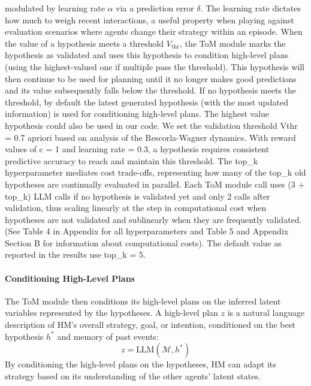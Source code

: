 \documentclass{article} %
\begin{document}
modulated by learning rate \( \alpha \) via a prediction error \( \delta \). The learning rate dictates how much to weigh recent interactions, a useful property when playing against evaluation scenarios where agents change their strategy within an episode. When the value of a hypothesis meets a threshold \( V_{\text{thr}} \), the ToM module marks the hypothesis as validated and uses this hypothesis to condition high-level plans (using the highest-valued one if multiple pass the threshold). This hypothesis will then continue to be used for planning until it no longer makes good predictions and its value subsequently falls below the threshold. If no hypothesis meets the threshold, by default the latest generated hypothesis (with the most updated information) is used for conditioning high-level plans. The highest value hypothesis could also be used in our code. We set the validation threshold Vthr = 0.7 apriori based on analysis of the Rescorla-Wagner dynamics. With reward values of c = 1 and learning rate  = 0.3, a hypothesis requires consistent predictive accuracy to reach and maintain this threshold. The top\_k hyperparameter mediates cost trade-offs, representing how many of the top\_k old hypotheses are continually evaluated in parallel. Each ToM module call uses (3 + top\_k) LLM calls if no hypothesis is validated yet and only 2 calls after validation, thus scaling linearly at the step in computational cost when hypotheses are not validated and sublinearly when they are frequently validated. (See Table 4 in Appendix for all hyperparameters and Table 5 and Appendix Section B for information about computational costs). The default value as reported in the results use top\_k = 5. 

\paragraph{Conditioning High-Level Plans}
The ToM module then conditions its high-level plans on the inferred latent variables represented by the hypotheses. A high-level plan $z$ is a natural language description of HM's overall strategy, goal, or intention, conditioned on the best hypothesis $h^*$ and memory of past events:
\begin{equation}
z = \text{LLM}(\mathcal{M}, h^*)
\end{equation}
By conditioning the high-level plans on the hypotheses, HM can adapt its strategy based on its understanding of the other agents' latent states.
\end{document}
